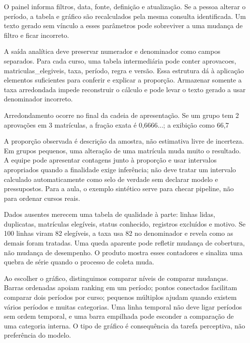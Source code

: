 O painel informa filtros, data, fonte, definição e atualização. Se a pessoa alterar o período, a tabela e gráfico são recalculados pela mesma consulta identificada. Um texto gerado sem vínculo a esses parâmetros pode sobreviver a uma mudança de filtro e ficar incorreto.

A saída analítica deve preservar numerador e denominador como campos separados. Para cada curso, uma tabela intermediária pode conter aprovacoes, matriculas\_elegiveis, taxa, período, regra e versão. Essa estrutura dá à aplicação elementos suficientes para conferir e explicar a proporção. Armazenar somente a taxa arredondada impede reconstruir o cálculo e pode levar o texto gerado a usar denominador incorreto.

Arredondamento ocorre no final da cadeia de apresentação. Se um grupo tem 2 aprovações em 3 matrículas, a fração exata é 0,6666...; a exibição como 66,7%

A proporção observada é descrição da amostra, não estimativa livre de incerteza. Em grupos pequenos, uma alteração de uma matrícula muda muito o resultado. A equipe pode apresentar contagens junto à proporção e usar intervalos apropriados quando a finalidade exige inferência; não deve tratar um intervalo calculado automaticamente como selo de verdade sem declarar modelo e pressupostos. Para a aula, o exemplo sintético serve para checar pipeline, não para ordenar cursos reais.

Dados ausentes merecem uma tabela de qualidade à parte: linhas lidas, duplicatas, matrículas elegíveis, status conhecido, registros excluídos e motivo. Se 100 linhas viram 82 elegíveis, a taxa usa 82 no denominador e revela como as demais foram tratadas. Uma queda aparente pode refletir mudança de cobertura, não mudança de desempenho. O produto mostra esses contadores e sinaliza uma quebra de série quando o processo de coleta muda.

Ao escolher o gráfico, distinguimos comparar níveis de comparar mudanças. Barras ordenadas apoiam ranking em um período; pontos conectados facilitam comparar dois períodos por curso; pequenos múltiplos ajudam quando existem vários períodos e muitas categorias. Uma linha temporal não deve ligar períodos sem ordem temporal, e uma barra empilhada pode esconder a comparação de uma categoria interna. O tipo de gráfico é consequência da tarefa perceptiva, não preferência do modelo.


